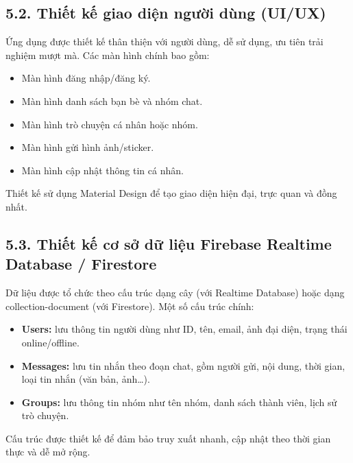 \documentclass[12pt,a4paper]{article}
\begin{document}
	\vspace{0.7cm}
	
	\subsection*{5.2. Thiết kế giao diện người dùng (UI/UX)}
	\vspace{0.1cm}
	
	\noindent
	Ứng dụng được thiết kế thân thiện với người dùng, dễ sử dụng, ưu tiên trải nghiệm mượt mà. Các màn hình chính bao gồm:
	\begin{itemize}
		\item Màn hình đăng nhập/đăng ký.
		\item Màn hình danh sách bạn bè và nhóm chat.
		\item Màn hình trò chuyện cá nhân hoặc nhóm.
		\item Màn hình gửi hình ảnh/sticker.
		\item Màn hình cập nhật thông tin cá nhân.
	\end{itemize}
	Thiết kế sử dụng Material Design để tạo giao diện hiện đại, trực quan và đồng nhất.
	
	\vspace{0.7cm}
	
	\subsection*{5.3. Thiết kế cơ sở dữ liệu Firebase Realtime Database / Firestore}
	\vspace{0.1cm}
	
	\noindent
	Dữ liệu được tổ chức theo cấu trúc dạng cây (với Realtime Database) hoặc dạng collection-document (với Firestore). Một số cấu trúc chính:
	\begin{itemize}
		\item \textbf{Users:} lưu thông tin người dùng như ID, tên, email, ảnh đại diện, trạng thái online/offline.
		\item \textbf{Messages:} lưu tin nhắn theo đoạn chat, gồm người gửi, nội dung, thời gian, loại tin nhắn (văn bản, ảnh…).
		\item \textbf{Groups:} lưu thông tin nhóm như tên nhóm, danh sách thành viên, lịch sử trò chuyện.
	\end{itemize}
	Cấu trúc được thiết kế để đảm bảo truy xuất nhanh, cập nhật theo thời gian thực và dễ mở rộng.
	
\end{document}
